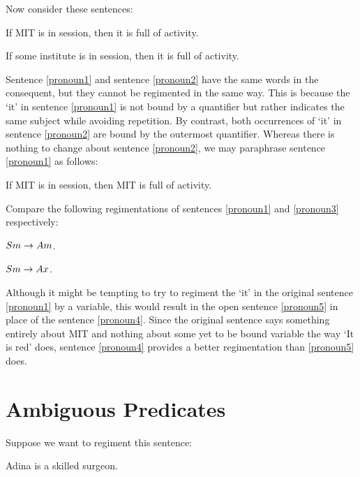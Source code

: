Now consider these sentences:

\begin{earg}
  \item[\ex{pronoun1}] If MIT is in session, then it is full of activity.
  \item[\ex{pronoun2}] If some institute is in session, then it is full of activity.
\end{earg}

Sentence \ref{pronoun1} and sentence \ref{pronoun2} have the same words in the consequent, but they cannot be regimented in the same way.
This is because the `it' in sentence \ref{pronoun1} is not bound by a quantifier but rather indicates the same subject while avoiding repetition.
By contrast, both occurrences of `it' in sentence \ref{pronoun2} are bound by the outermost quantifier.
Whereas there is nothing to change about sentence \ref{pronoun2}, we may paraphrase sentence \ref{pronoun1} as follows:

\begin{earg}
  \item[\ex{pronoun3}] If MIT is in session, then MIT is full of activity.
\end{earg}

Compare the following regimentations of sentences \ref{pronoun1} and \ref{pronoun3} respectively:

\begin{earg}
  \item[\ex{pronoun4}] $Sm \rightarrow Am$.
  \item[\ex{pronoun5}] $Sm \rightarrow Ax$.
\end{earg}

Although it might be tempting to try to regiment the `it' in the original sentence \ref{pronoun1} by a variable, this would result in the open sentence \ref{pronoun5} in place of the sentence \ref{pronoun4}.
Since the original sentence says something entirely about MIT and nothing about some yet to be bound variable the way `It is red' does, sentence \ref{pronoun4} provides a better regimentation than \ref{pronoun5} does.




\section{Ambiguous Predicates}

Suppose we want to regiment this sentence:

\begin{earg}
  \item[\ex{amb1}] Adina is a skilled surgeon.
\end{earg}

